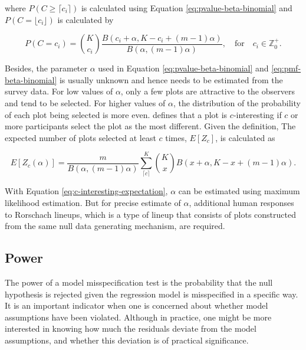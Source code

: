 \documentclass[]{interact}
\theoremstyle{plain}%
\theoremstyle{definition}
\theoremstyle{remark}
\begin{document}
where \(P(C \geq \lceil c_i \rceil)\) is calculated using Equation
\ref{eq:pvalue-beta-binomial} and \(P(C = \lfloor c_i \rfloor)\) is
calculated by

\begin{equation} \label{eq:pmf-beta-binomial}
P(C = c_i) = {K \choose c_i}\frac{B(c_i + \alpha, K - c_i + (m - 1)\alpha)}{B(\alpha, (m-1)\alpha)},\quad \text{for} \quad c_i \in \mathbb{Z}_0^+.
\end{equation}

Besides, the parameter \(\alpha\) used in Equation
\ref{eq:pvalue-beta-binomial} and \ref{eq:pmf-beta-binomial} is usually
unknown and hence needs to be estimated from the survey data. For low
values of \(\alpha\), only a few plots are attractive to the observers
and tend to be selected. For higher values of \(\alpha\), the
distribution of the probability of each plot being selected is more
even. \citet{vanderplas2021statistical} defines that a plot is
\(c\)-interesting if \(c\) or more participants select the plot as the
most different. Given the definition, The expected number of plots
selected at least \(c\) times, \(E[Z_c]\), is calculated as

\begin{equation} \label{eq:c-interesting-expectation}
E[Z_c(\alpha)] = \frac{m}{B(\alpha, (m-1)\alpha)}\sum_{\lceil c \rceil}^{K}{K \choose x} B(x + \alpha, K - x + (m-1)\alpha).\end{equation}

With Equation \ref{eq:c-interesting-expectation}, \(\alpha\) can be
estimated using maximum likelihood estimation. But for precise estimate
of \(\alpha\), additional human responses to Rorschach lineups, which is
a type of lineup that consists of plots constructed from the same null
data generating mechanism, are required.

\hypertarget{power}{%
\subsection{Power}\label{power}}

The power of a model misspecification test is the probability that the
null hypothesis is rejected given the regression model is misspecified
in a specific way. It is an important indicator when one is concerned
about whether model assumptions have been violated. Although in
practice, one might be more interested in knowing how much the residuals
deviate from the model assumptions, and whether this deviation is of
practical significance.
\end{document}
